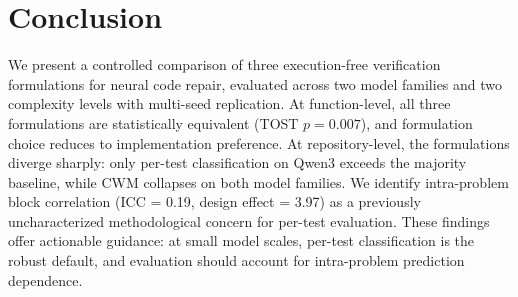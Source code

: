 \documentclass[11pt,a4paper]{article}
\begin{document}
\section{Conclusion}

We present a controlled comparison of three execution-free verification formulations for neural code repair, evaluated across two model families and two complexity levels with multi-seed replication. At function-level, all three formulations are statistically equivalent (TOST $p{=}0.007$), and formulation choice reduces to implementation preference. At repository-level, the formulations diverge sharply: only per-test classification on Qwen3 exceeds the majority baseline, while CWM collapses on both model families. We identify intra-problem block correlation (ICC = 0.19, design effect = 3.97) as a previously uncharacterized methodological concern for per-test evaluation. These findings offer actionable guidance: at small model scales, per-test classification is the robust default, and evaluation should account for intra-problem prediction dependence.
\end{document}
